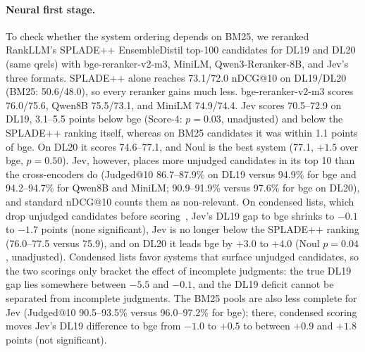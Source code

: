 


\paragraph{Neural first stage.}\label{app:first-stage}
To check whether the system ordering depends on BM25, we reranked RankLLM's SPLADE++ EnsembleDistil top-100 candidates for DL19 and DL20 (same qrels) with bge-reranker-v2-m3, MiniLM, Qwen3-Reranker-8B, and Jev's three formats. SPLADE++ alone reaches 73.1/72.0 nDCG@10 on DL19/DL20 (BM25: 50.6/48.0), so every reranker gains much less. bge-reranker-v2-m3 scores 76.0/75.6, Qwen8B 75.5/73.1, and MiniLM 74.9/74.4. Jev scores 70.5--72.9 on DL19, 3.1--5.5 points below bge (Score-4: $p=0.03$, unadjusted) and below the SPLADE++ ranking itself, whereas on BM25 candidates it was within 1.1 points of bge. On DL20 it scores 74.6--77.1, and Noul is the best system (77.1, $+1.5$ over bge, $p=0.50$). Jev, however, places more unjudged candidates in its top 10 than the cross-encoders do (Judged@10 86.7--87.9\% on DL19 versus 94.9\% for bge and 94.2--94.7\% for Qwen8B and MiniLM; 90.9--91.9\% versus 97.6\% for bge on DL20), and standard nDCG@10 counts them as non-relevant. On condensed lists, which drop unjudged candidates before scoring~\cite{sakai2007alternatives}, Jev's DL19 gap to bge shrinks to $-0.1$ to $-1.7$ points (none significant), Jev is no longer below the SPLADE++ ranking (76.0--77.5 versus 75.9), and on DL20 it leads bge by $+3.0$ to $+4.0$ (Noul $p=0.04$, unadjusted). Condensed lists favor systems that surface unjudged candidates, so the two scorings only bracket the effect of incomplete judgments: the true DL19 gap lies somewhere between $-5.5$ and $-0.1$, and the DL19 deficit cannot be separated from incomplete judgments. The BM25 pools are also less complete for Jev (Judged@10 90.5--93.5\% versus 96.0--97.2\% for bge); there, condensed scoring moves Jev's DL19 difference to bge from $-1.0$ to $+0.5$ to between $+0.9$ and $+1.8$ points (not significant).


